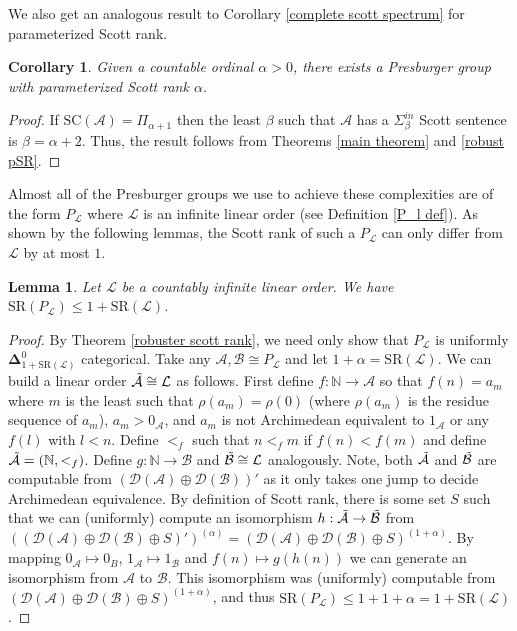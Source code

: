 \documentclass{amsart}%
\numberwithin{theorem}{section}
\newtheorem{corollary}[theorem]{Corollary}
\newtheorem{lemma}[theorem]{Lemma}
\newcommand{\N}{\mathbb{N}}
\newcommand{\A}{\mathcal{A}}
\newcommand{\B}{\mathcal{B}}
\newcommand{\D}{\mathcal{D}}
\newcommand{\0}{\emptyset}
\newcommand{\LL}{\mathcal{L}}
\newcommand{\SR}{\text{SR}}
\newcommand{\SC}{\text{SC}}
\begin{document}
We also get an analogous result to Corollary \ref{complete scott spectrum} for parameterized Scott rank.

\begin{corollary}
    Given a countable ordinal $\alpha>0$, there exists a Presburger group with parameterized Scott rank $\alpha$. 
\end{corollary}

\begin{proof}
    If $\SC(\A)=\Pi_{\alpha +1}$ then the least $\beta$ such that $\A$ has a $\Sigma_{\beta}^{in}$ Scott sentence is $\beta=\alpha +2$. Thus, the result follows from Theorems \ref{main theorem} and \ref{robust pSR}. 
\end{proof} 

Almost all of the Presburger groups we use to achieve these complexities are of the form $P_\LL$ where $\LL$ is an infinite linear order (see Definition \ref{P_l def}). As shown by the following lemmas, the Scott rank of such a $P_\LL$ can only differ from $\LL$ by at most $1$. 

\begin{lemma}
\label{less than 1 +}
Let $\LL$ be a countably infinite linear order. We have $\SR(P_\LL)\leq 1+\SR(\LL)$.
\end{lemma}

\begin{proof}
  By Theorem \ref{robuster scott rank}, we need only show that $P_\LL$ is uniformly $\boldsymbol{\Delta}^0_{1+\SR(\LL)}$ categorical. Take any $\A,\B\cong P_\LL$ and let $1+\alpha= \SR(\LL)$.  We can build a linear order $\Tilde{\A}\cong \LL$ as follows. First define $f:\N\to \A$ so that $f(n)=a_m$ where $m$ is the least such that $\rho(a_m)=\rho(0)$ (where $\rho(a_m)$ is the residue sequence of $a_m$), $a_m>0_\A$, and $a_m$ is not Archimedean equivalent to  $1_\A$ or any $f(l)$ with $l<n$. Define $<_f$ such that $n<_f m$ if $f(n)<f(m)$ and define $\Tilde{\A}=(\N,<_f)$. Define $g:\N\to\B$ and $\Tilde{\B}\cong \LL$ analogously. Note, both $\Tilde{\A}$ and $\Tilde{\B}$ are computable from $(\D(\A)\oplus \D(\B))'$ as it only takes one jump to decide Archimedean equivalence. By definition of Scott rank, there is some set $S$ such that we can (uniformly) compute an isomorphism $h:\Tilde{\A} \to \Tilde{\B}$ from $((\D(\A)\oplus \D(\B)\oplus S)')^{(\alpha)}= (\D(\A)\oplus \D(\B)\oplus S)^{(1+\alpha)}$. By mapping $0_\A\mapsto 0_B$, $1_\A \mapsto 1_\B$ and $f(n)\mapsto g(h(n)) $ we can generate an isomorphism from $\A$ to $\B$. This isomorphism was (uniformly) computable from $(\D(\A)\oplus \D(\B)\oplus S)^{(1+\alpha)}$, and thus $\SR(P_\LL)\leq 1+1+\alpha = 1+\SR(\LL)$. 
  \end{proof}
\end{document}

